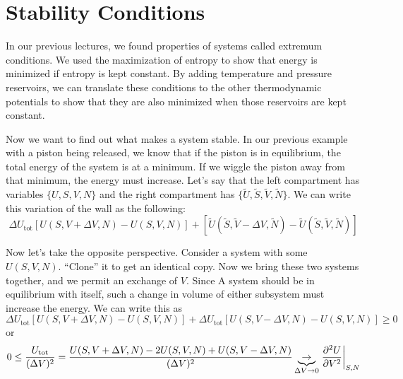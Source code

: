 \documentclass[a4paper,twoside,master.tex]{subfiles}
\begin{document}

\section{Stability Conditions}
\label{sec:stability_conditions}

In our previous lectures, we found properties of systems called extremum conditions. We used the maximization of entropy to show that energy is minimized if entropy is kept constant. By adding temperature and pressure reservoirs, we can translate these conditions to the other thermodynamic potentials to show that they are also minimized when those reservoirs are kept constant.\par

Now we want to find out what makes a system stable. In our previous example with a piston being released, we know that if the piston is in equilibrium, the total energy of the system is at a minimum. If we wiggle the piston away from that minimum, the energy must increase. Let's say that the left compartment has variables $ \{U,S,V,N\} $ and the right compartment has $ \{\tilde{U}, \tilde{S}, \tilde{V}, \tilde{N}\} $. We can write this variation of the wall as the following:
\begin{equation}
    \Delta U_{\text{tot}} \left[ U(S,V + \Delta V, N) - U(S,V,N) \right] + \left[ \tilde{U}(\tilde{S}, \tilde{V} - \Delta V, \tilde{N}) - \tilde{U}(\tilde{S}, \tilde{V}, \tilde{N}) \right]
\end{equation}

Now let's take the opposite perspective. Consider a system with some $ U(S,V,N) $. ``Clone'' it to get an identical copy. Now we bring these two systems together, and we permit an exchange of $ V $. Since A system should be in equilibrium with itself, such a change in volume of either subsystem must increase the energy. We can write this as
\begin{equation}
    \Delta U_{\text{tot}} \left[ U(S,V + \Delta V, N) - U(S,V,N) \right] + \Delta U_{\text{tot}} \left[ U(S,V - \Delta V, N) - U(S,V,N) \right] \geq 0
\end{equation}
or
\begin{equation}
    0 \leq \frac{U_{\text{tot}}}{(\Delta V)^2} = \frac{U(S,V+ \Delta V, N) - 2 U(S,V,N) + U(S, V - \Delta V, N)}{(\Delta V)^2} \underbrace{\to}_{\Delta V \to 0} \eval{\pdv[2]{U}{V}}_{S,N}
\end{equation}
\end{document}
